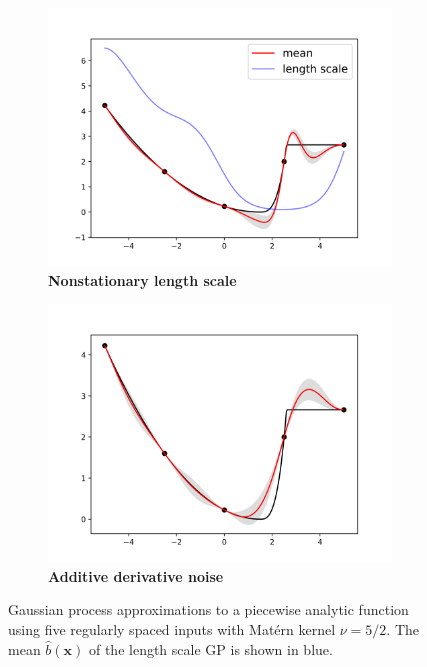 \documentclass{article}
\renewcommand{\vec}[1]{\mathbf{#1}}
\numberwithin{equation}{section}
\begin{document}
\begin{figure}
\begin{subfigure}[b]{.4\textwidth}
      \includegraphics[scale=0.35]{figures/kink-length.png}
      \caption{\textbf{Nonstationary length scale}}
    \end{subfigure}%
    \begin{subfigure}[b]{.4\textwidth}
      \centering
      \includegraphics[scale=0.35]{figures/kink-noisy.png}
      \caption{\textbf{Additive derivative noise}}
    \end{subfigure}
		\caption{Gaussian process approximations to a piecewise analytic function using five regularly spaced inputs with Mat\'ern kernel $\nu = 5/2$. The mean $\hat{b}(\vec{x})$ of the length scale GP is shown in blue.}
		\label{nonstationary}
\end{figure}
\end{document}
